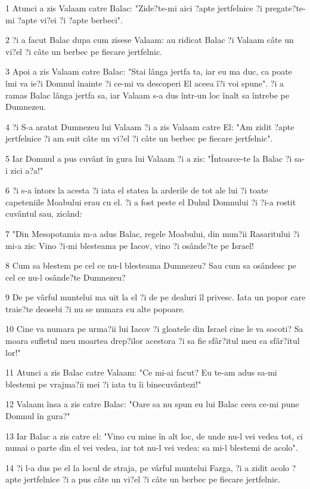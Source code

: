 \par 1 Atunci a zis Valaam catre Balac: "Zide?te-mi aici ?apte jertfelnice ?i pregate?te-mi ?apte vi?ei ?i ?apte berbeci".
\par 2 ?i a facut Balac dupa cum zisese Valaam: au ridicat Balac ?i Valaam câte un vi?el ?i câte un berbec pe fiecare jertfelnic.
\par 3 Apoi a zis Valaam catre Balac: "Stai lânga jertfa ta, iar eu ma duc, ca poate îmi va ie?i Domnul înainte ?i ce-mi va descoperi El aceea î?i voi spune". ?i a ramas Balac lânga jertfa sa, iar Valaam s-a dus într-un loc înalt sa întrebe pe Dumnezeu.
\par 4 ?i S-a aratat Dumnezeu lui Valaam ?i a zis Valaam catre El: "Am zidit ?apte jertfelnice ?i am suit câte un vi?el ?i câte un berbec pe fiecare jertfelnic".
\par 5 Iar Domnul a pus cuvânt în gura lui Valaam ?i a zis: "Întoarce-te la Balac ?i sa-i zici a?a!"
\par 6 ?i s-a întors la acesta ?i iata el statea la arderile de tot ale lui ?i toate capeteniile Moabului erau cu el. ?i a fost peste el Duhul Domnului ?i ?i-a rostit cuvântul sau, zicând:
\par 7 "Din Mesopotamia m-a adus Balac, regele Moabului, din mun?ii Rasaritului ?i mi-a zis: Vino ?i-mi blesteama pe Iacov, vino ?i osânde?te pe Israel!
\par 8 Cum sa blestem pe cel ce nu-l blesteama Dumnezeu? Sau cum sa osândesc pe cel ce nu-l osânde?te Dumnezeu?
\par 9 De pe vârful muntelui ma uit la el ?i de pe dealuri îl privesc. Iata un popor care traie?te deosebi ?i nu se numara cu alte popoare.
\par 10 Cine va numara pe urma?ii lui Iacov ?i gloatele din Israel cine le va socoti? Sa moara sufletul meu moartea drep?ilor acestora ?i sa fie sfâr?itul meu ca sfâr?itul lor!"
\par 11 Atunci a zis Balac catre Valaam: "Ce mi-ai facut? Eu te-am adus sa-mi blestemi pe vrajma?ii mei ?i iata tu îi binecuvântezi!"
\par 12 Valaam însa a zis catre Balac: "Oare sa nu spun eu lui Balac ceea ce-mi pune Domnul în gura?"
\par 13 Iar Balac a zis catre el: "Vino cu mine în alt loc, de unde nu-l vei vedea tot, ci numai o parte din el vei vedea, iar tot nu-l vei vedea: sa mi-l blestemi de acolo".
\par 14 ?i l-a dus pe el la locul de straja, pe vârful muntelui Fazga, ?i a zidit acolo ?apte jertfelnice ?i a pus câte un vi?el ?i câte un berbec pe fiecare jertfelnic.
